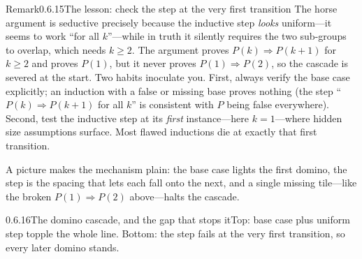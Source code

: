 \documentclass[main.tex]{subfiles}
\begin{document}
\begin{ObjL}{Remark}{0.6.15}{The lesson: check the step at the very first transition}
The horse argument is seductive precisely because the inductive step \emph{looks} uniform---it seems
to work ``for all $k$''---while in truth it silently requires the two sub-groups to overlap, which
needs $k\ge 2$. The argument proves $P(k)\Rightarrow P(k+1)$ for $k\ge 2$ and proves $P(1)$, but it
never proves $P(1)\Rightarrow P(2)$, so the cascade is severed at the start. Two habits inoculate you.
First, always verify the base case explicitly; an induction with a false or missing base proves
nothing (the step ``$P(k)\Rightarrow P(k+1)$ for all $k$'' is consistent with $P$ being false
everywhere). Second, test the inductive step at its \emph{first} instance---here $k=1$---where hidden
size assumptions surface. Most flawed inductions die at exactly that first transition.
\end{ObjL}

\noindent A picture makes the mechanism plain: the base case lights the first domino, the step is the
spacing that lets each fall onto the next, and a single missing tile---like the broken
$P(1)\Rightarrow P(2)$ above---halts the cascade.

\begin{Fig}{0.6.16}{The domino cascade, and the gap that stops it}{Top: base case plus uniform step
topple the whole line. Bottom: the step fails at the very first transition, so every later domino
stands.}
\end{Fig}
\end{document}
